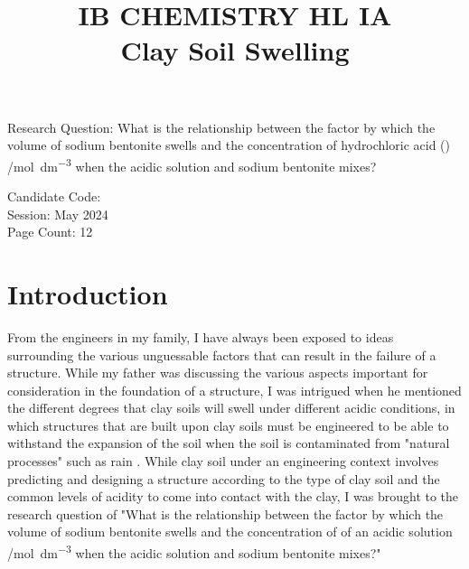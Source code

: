 \documentclass[11pt, letterpaper]{article}
\title{IB CHEMISTRY HL IA
\\
Clay Soil Swelling}
\author{}
\date{}
\begin{document}
\nocite{*}

\maketitle

\begin{center}
    Research Question: What is the relationship between
    the factor by which the volume of
    sodium bentonite swells and the concentration of hydrochloric acid () /\unit{mol.dm^{-3}} when the acidic solution and sodium bentonite
    mixes?
    \\
\end{center}

\begin{center}
    Candidate Code:
    \\
    Session: May 2024
    \\
    Page Count: 12
\end{center}
\newpage

\tableofcontents
\newpage


\section{Introduction}

\setcounter{page}{1}

From the engineers in my family, I have always been exposed to ideas
surrounding the various unguessable factors that can
result in the failure of a structure.
While my father was discussing the various
aspects important for consideration in the foundation
of a structure, I was intrigued when he mentioned the different
degrees that clay soils will swell under different acidic conditions,
in which structures that are built upon clay soils must
be engineered to be able to withstand the expansion of the soil
when the soil is contaminated from "natural processes" such
as rain \cite{ramavaraprasadSwellingCharacteristicsSoils2018a}.
While clay soil under an engineering context involves
predicting and designing a structure according to the
type of clay soil and the common levels of acidity
to come into contact with the clay, I was brought to the
research question of "What is the relationship between
the factor by which the volume of
sodium bentonite swells and the concentration of  of an acidic solution /\unit{mol.dm^{-3}} when the acidic solution and sodium bentonite
mixes?"
\end{document}
